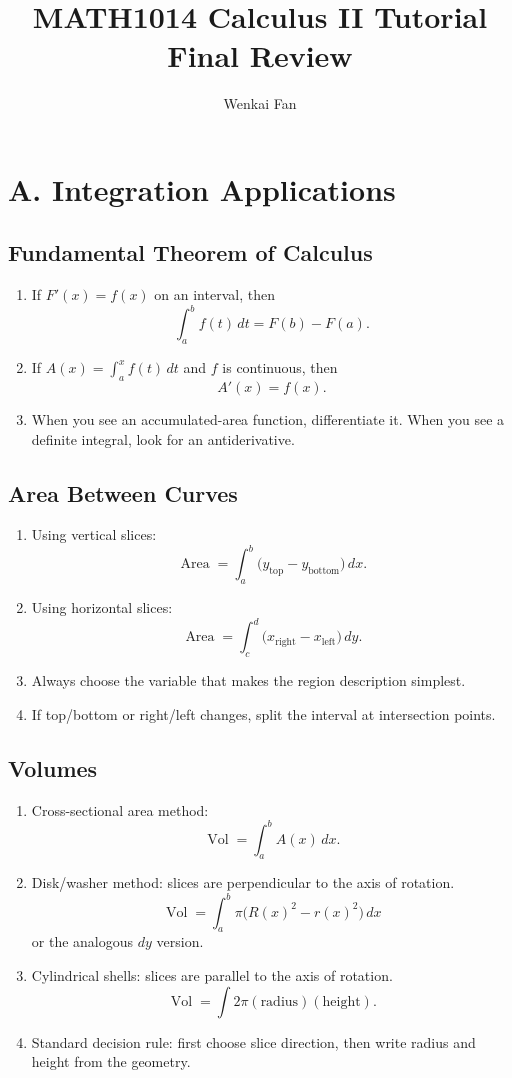 \documentclass[11pt]{article}
\title{\vspace{-1.0em}MATH1014 Calculus II Tutorial\\Final Review}
\author{Wenkai Fan}
\date{}
\DeclareMathOperator{\Area}{Area}
\DeclareMathOperator{\Vol}{Vol}
\begin{document}
\maketitle
\thispagestyle{fancy}

\section{A. Integration Applications}

\subsection{Fundamental Theorem of Calculus}
\begin{enumerate}
  \item If $F'(x)=f(x)$ on an interval, then
  \[
  \int_a^b f(t)\,dt=F(b)-F(a).
  \]
  \item If $A(x)=\int_a^x f(t)\,dt$ and $f$ is continuous, then
  \[
  A'(x)=f(x).
  \]
  \item When you see an accumulated-area function, differentiate it. When you see a definite integral, look for an antiderivative.
\end{enumerate}

\subsection{Area Between Curves}
\begin{enumerate}
  \item Using vertical slices:
  \[
  \Area=\int_a^b \bigl(y_{\text{top}}-y_{\text{bottom}}\bigr)\,dx.
  \]
  \item Using horizontal slices:
  \[
  \Area=\int_c^d \bigl(x_{\text{right}}-x_{\text{left}}\bigr)\,dy.
  \]
  \item Always choose the variable that makes the region description simplest.
  \item If top/bottom or right/left changes, split the interval at intersection points.
\end{enumerate}

\subsection{Volumes}
\begin{enumerate}
  \item Cross-sectional area method:
  \[
  \Vol=\int_a^b A(x)\,dx.
  \]
  \item Disk/washer method: slices are perpendicular to the axis of rotation.
  \[
  \Vol=\int_a^b \pi\bigl(R(x)^2-r(x)^2\bigr)\,dx
  \]
  or the analogous $dy$ version.
  \item Cylindrical shells: slices are parallel to the axis of rotation.
  \[
  \Vol=\int 2\pi(\text{radius})(\text{height}).
  \]
  \item Standard decision rule: first choose slice direction, then write radius and height from the geometry.
\end{enumerate}
\end{document}
